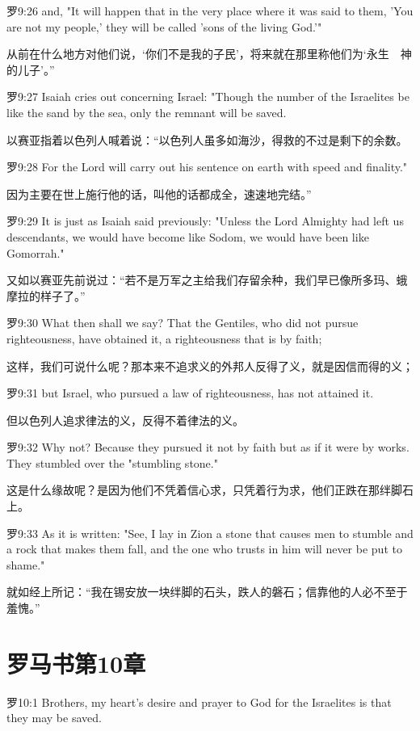 \documentclass[a4paper,11pt,onecolumn,twoside]{ctexart}
\begin{document}
\begin{multicols}{2}
 罗9:26
 and, "It will happen that in the very place where it was said to them, 'You are not my people,' they will be called 'sons of the living God.'"

 从前在什么地方对他们说，‘你们不是我的子民’，将来就在那里称他们为‘永生　神的儿子’。”


 罗9:27
 Isaiah cries out concerning Israel: "Though the number of the Israelites be like the sand by the sea, only the remnant will be saved.

 以赛亚指着以色列人喊着说：“以色列人虽多如海沙，得救的不过是剩下的余数。


 罗9:28
 For the Lord will carry out his sentence on earth with speed and finality."

 因为主要在世上施行他的话，叫他的话都成全，速速地完结。”


 罗9:29
 It is just as Isaiah said previously: "Unless the Lord Almighty had left us descendants, we would have become like Sodom, we would have been like Gomorrah."

 又如以赛亚先前说过：“若不是万军之主给我们存留余种，我们早已像所多玛、蛾摩拉的样子了。”


 罗9:30
 What then shall we say? That the Gentiles, who did not pursue righteousness, have obtained it, a righteousness that is by faith;

 这样，我们可说什么呢？那本来不追求义的外邦人反得了义，就是因信而得的义；


 罗9:31
 but Israel, who pursued a law of righteousness, has not attained it.

 但以色列人追求律法的义，反得不着律法的义。


 罗9:32
 Why not? Because they pursued it not by faith but as if it were by works. They stumbled over the "stumbling stone."

 这是什么缘故呢？是因为他们不凭着信心求，只凭着行为求，他们正跌在那绊脚石上。


 罗9:33
 As it is written: "See, I lay in Zion a stone that causes men to stumble and a rock that makes them fall, and the one who trusts in him will never be put to shame."

 就如经上所记：“我在锡安放一块绊脚的石头，跌人的磐石；信靠他的人必不至于羞愧。”


 \section{罗马书第10章}
 罗10:1
 Brothers, my heart's desire and prayer to God for the Israelites is that they may be saved.


\end{multicols}
\end{document}
